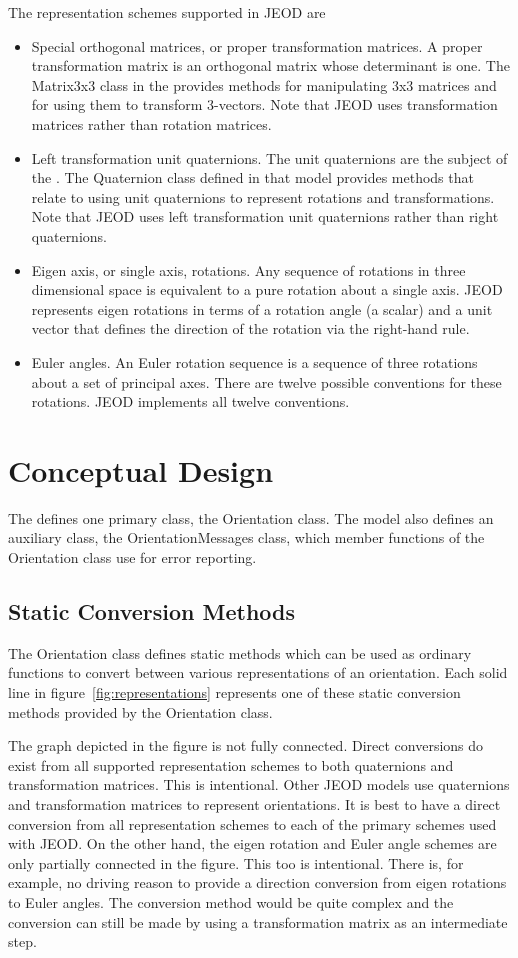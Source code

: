 The representation schemes supported in JEOD are
\begin{itemize}
\item Special orthogonal matrices, or proper transformation matrices.
A proper transformation matrix is an orthogonal matrix whose determinant is one.
The Matrix3x3 class in the  provides methods for
manipulating 3x3 matrices and for using them to transform 3-vectors.
Note that JEOD uses transformation matrices rather than rotation matrices.
\item Left transformation unit quaternions.
The unit quaternions are the subject of the .
The Quaternion class defined in that model provides methods that relate to
using unit quaternions to represent rotations and transformations.
Note that JEOD uses left transformation unit quaternions rather than
right quaternions.
\item Eigen axis, or single axis, rotations.
Any sequence of rotations in three dimensional space is equivalent to
a pure rotation about a single axis.
JEOD represents eigen rotations in terms of a rotation angle (a scalar) and a
unit vector that defines the direction of the rotation via the right-hand rule.
\item Euler angles. An Euler rotation sequence is a sequence of three
rotations about a set of principal axes. There are twelve possible conventions
for these rotations. JEOD implements all twelve conventions.
\end{itemize}


\section{Conceptual Design}
The \ModelDesc defines one primary class, the Orientation class.
The model also defines an auxiliary class, the OrientationMessages class, which
member functions of the Orientation class use for error reporting.

\subsection{Static Conversion Methods}
The Orientation class defines static methods which can be used as ordinary
functions to convert between various representations of an orientation.
Each solid line in figure~\ref{fig:representations} represents one of these
static conversion methods provided by the Orientation class.

The graph depicted in the figure is not fully connected. Direct conversions
do exist from all supported representation schemes to both quaternions and
transformation matrices. This is intentional. Other JEOD models use quaternions
and transformation matrices to represent orientations. It is best to have
a direct conversion from all representation schemes to each of the primary
schemes used with JEOD. On the other hand, the eigen rotation and Euler angle
schemes are only partially connected in the figure. This too is intentional.
There is, for example, no driving reason to provide a direction conversion from
eigen rotations to Euler angles. The conversion method would be quite complex
and the conversion can still be made by using a transformation matrix as
an intermediate step.

